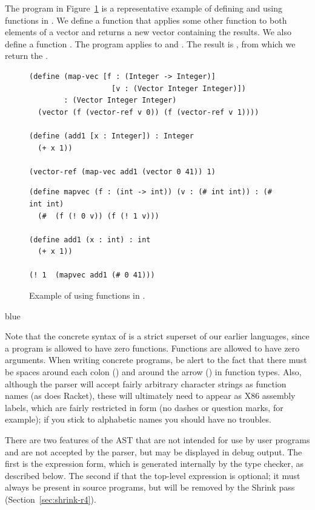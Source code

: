 \documentclass[11pt]{book}
\newenvironment{ocamlx}{
  \begin{color}{blue}
}
{
  \end{color}
}
\begin{document}
The program in Figure~\ref{fig:Rfun-function-example} is a
representative example of defining and using functions in \LangFun{}.  We
define a function  that applies some other function
 to both elements of a vector and returns a new
vector containing the results. We also define a function .
The program applies
 to  and .  The result is
, from which we return the .

\begin{figure}[tbp]
\begin{lstlisting}
(define (map-vec [f : (Integer -> Integer)]
                   [v : (Vector Integer Integer)])
        : (Vector Integer Integer)
  (vector (f (vector-ref v 0)) (f (vector-ref v 1))))

(define (add1 [x : Integer]) : Integer
  (+ x 1))

(vector-ref (map-vec add1 (vector 0 41)) 1)
\end{lstlisting}
\begin{lstlisting}[style=ocaml]
(define mapvec (f : (int -> int)) (v : (# int int)) : (# int int)
  (#  (f (! 0 v)) (f (! 1 v)))

(define add1 (x : int) : int 
  (+ x 1))

(! 1  (mapvec add1 (# 0 41)))
\end{lstlisting}
\caption{Example of using functions in \LangFun{}.}
\label{fig:Rfun-function-example}
\end{figure}

\begin{ocamlx}
  Note that the concrete syntax of \LangFun{} is a strict superset of our
  earlier languages, since a program is allowed to have zero functions.
  Functions are allowed to have zero arguments.
  When writing concrete programs, be alert to the fact that there must be
  spaces around each colon (\code{:}) and around the arrow (\code{->})
  in function types. Also, although the parser will accept fairly arbitrary
  character strings as function names (as does Racket), these will ultimately need to appear
  as X86 assembly labels, which are fairly restricted in form (no dashes
  or question marks, for example); if you stick to alphabetic names you should have no troubles.

  There are two features of the \LangFun{} AST that are not intended for
  use by user programs and are not accepted by the parser, but may
  be displayed in debug output. The first is the \code{(\& \Var)} expression
  form, which is generated internally by the type checker, as described below.
  The second if that the top-level expression is optional; it must always
  be present in source programs, but will be removed by the Shrink pass
  (Section~\ref{sec:shrink-r4}).
\end{ocamlx}
\end{document}
